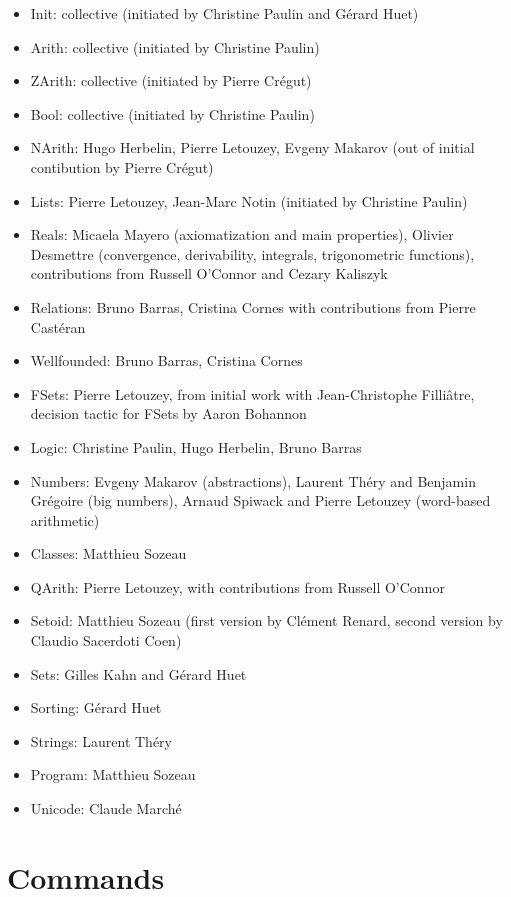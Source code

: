 \documentclass{article}
\begin{document}
\begin{itemize}
\item Init: collective (initiated by Christine Paulin and Gérard Huet)
\item Arith: collective (initiated by Christine Paulin)
\item ZArith: collective (initiated by Pierre Crégut)
\item Bool: collective (initiated by Christine Paulin)
\item NArith: Hugo Herbelin, Pierre Letouzey, Evgeny Makarov (out of
  initial contibution by Pierre Crégut)
\item Lists: Pierre Letouzey, Jean-Marc Notin (initiated by Christine Paulin)
\item Reals: Micaela Mayero (axiomatization and main properties), Olivier Desmettre (convergence, derivability, integrals, trigonometric functions), contributions from Russell O'Connor and Cezary Kaliszyk
\item Relations: Bruno Barras, Cristina Cornes with contributions from
  Pierre Castéran
\item Wellfounded: Bruno Barras, Cristina Cornes
\item FSets: Pierre Letouzey, from initial work with Jean-Christophe Filliâtre, decision tactic for FSets by Aaron Bohannon
\item Logic: Christine Paulin, Hugo Herbelin, Bruno Barras
\item Numbers: Evgeny Makarov (abstractions), Laurent Théry and Benjamin Grégoire (big numbers), Arnaud Spiwack and Pierre Letouzey (word-based arithmetic)
\item Classes: Matthieu Sozeau
\item QArith: Pierre Letouzey, with contributions from Russell O'Connor
\item Setoid: Matthieu Sozeau (first version by Clément Renard, second version by Claudio Sacerdoti Coen)
\item Sets: Gilles Kahn and Gérard Huet
\item Sorting: Gérard Huet
\item Strings: Laurent Théry
\item Program: Matthieu Sozeau
\item Unicode: Claude Marché
\end{itemize}

\section{Commands}
\end{document}
